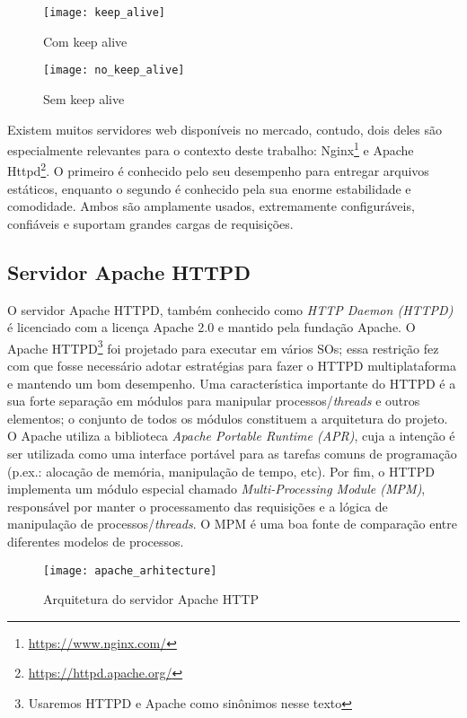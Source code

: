 \begin{figure}[!h]
  \centering
  \texttt{[image: keep\_alive]}
  \caption{Com keep alive}
  \label{fig:keep_alive}
\end{figure}

\begin{figure}[!h]
  \centering
  \texttt{[image: no\_keep\_alive]}
  \caption{Sem keep alive}
  \label{fig:no_keep_alive}
\end{figure}

Existem muitos servidores web disponíveis no mercado, contudo, dois deles são
especialmente relevantes para o contexto deste trabalho:
Nginx\footnote{\url{https://www.nginx.com/}} e Apache
Httpd\footnote{\url{https://httpd.apache.org/}}.  O primeiro é conhecido pelo
seu desempenho para entregar arquivos estáticos, enquanto o segundo é conhecido
pela sua enorme estabilidade e comodidade. Ambos são amplamente usados,
extremamente configuráveis, confiáveis e suportam grandes cargas de
requisições.

\subsection{Servidor Apache HTTPD}
\label{sec:architecture}

O servidor Apache HTTPD, também conhecido como \emph{HTTP Daemon (HTTPD)} é
licenciado com a licença Apache 2.0 e mantido pela fundação Apache.  O Apache
HTTPD\footnote{Usaremos HTTPD e Apache como sinônimos nesse texto} foi
projetado para executar em vários SOs; essa restrição fez com que fosse
necessário adotar estratégias para fazer o HTTPD multiplataforma e mantendo um
bom desempenho. Uma característica importante do HTTPD é a sua forte separação
em módulos para manipular processos/\emph{threads} e outros elementos; o
conjunto de todos os módulos constituem a arquitetura do projeto. O Apache
utiliza a biblioteca \emph{Apache Portable Runtime (APR)}, cuja a intenção é
ser utilizada como uma interface portável para as tarefas comuns de programação
(p.ex.: alocação de memória, manipulação de tempo, etc). Por fim, o HTTPD
implementa um módulo especial chamado \emph{Multi-Processing Module (MPM)},
responsável por manter o processamento das requisições e a lógica de
manipulação de processos/\emph{threads}. O MPM é uma boa fonte de comparação entre
diferentes modelos de processos.

\begin{figure}[!h]
  \centering
  \texttt{[image: apache\_arhitecture]} 
	\caption[Arquitetura do servidor Apache HTTP]{Arquitetura do servidor Apache HTTP \citep{apache_module_book}}
  \label{fig:apache_architecture} 
\end{figure}

